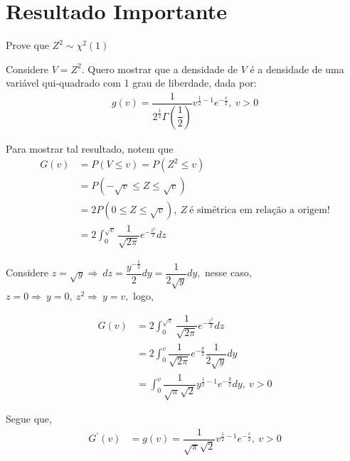 \documentclass[12pt]{beamer}
\begin{document}
\section{Resultado Importante}
\begin{frame}{Prove que $Z^2\sim \chi^{2}(1)$}
\begin{block}{}
\justifying
Considere $V=Z^{2}.$ Quero mostrar que a densidade de $V$ é a densidade de uma variável qui-quadrado com 1 grau de liberdade, dada por:
\begin{align*}
    g(v)=\dfrac{1}{2^{\frac{1}{2}}\Gamma\left(\dfrac{1}{2}\right)}v^{\frac{1}{2}-1}e^{-\frac{v}{2}},~v>0
\end{align*}
\end{block}
\pause
\begin{block}{}
\justifying
Para mostrar tal resultado, notem que 
\begin{align*}
    G(v)&=P(V\leq v)=P(Z^{2}\leq v)\\
    &=P(-\sqrt{v}\leq Z\leq \sqrt{v})\\
    &=2P(0\leq Z\leq \sqrt{v}),~Z~\text{é simétrica em relação a origem!}\\
    &=2{\displaystyle\int_{0}^{\sqrt{v}}}\dfrac{1}{\sqrt{2\pi}}e^{-\frac{z^{2}}{2}}dz
\end{align*}
\end{block}
\end{frame}

\begin{frame}{}
\begin{block}{}
\justifying
Considere $z=\sqrt{y}\Rightarrow~dz=\dfrac{y^{-\frac{1}{2}}}{2}dy=\dfrac{1}{2\sqrt{y}}dy,$ nesse caso, $z=0\Rightarrow~y=0,~z^{2}\Rightarrow~y=v,$ logo, 
\end{block}
\pause
\begin{block}{}
\justifying
\begin{align*}
    G(v)&=2{\displaystyle\int_{0}^{\sqrt{v}}}\dfrac{1}{\sqrt{2\pi}}e^{-\frac{z^{2}}{2}}dz\\
    &=2{\displaystyle\int_{0}^{v}}\dfrac{1}{\sqrt{2\pi}}e^{-\frac{y}{2}}\dfrac{1}{2\sqrt{y}}dy\\
    &={\displaystyle\int_{0}^{v}}\dfrac{1}{\sqrt{\pi}\sqrt{2}}y^{\frac{1}{2}-1}e^{-\frac{y}{2}}dy,~v>0
\end{align*}
\end{block}
\pause 
\begin{block}{}
\justifying
Segue que,
\begin{align*}
    G^{'}(v)&=g(v)=\dfrac{1}{\sqrt{\pi}\sqrt{2}}v^{\frac{1}{2}-1}e^{-\frac{v}{2}},~v>0
\end{align*}
\end{block}
\end{frame}
\end{document}
